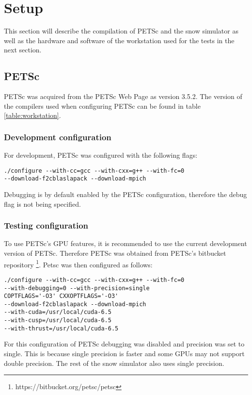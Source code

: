 \section{Setup}

This section will describe the compilation of PETSc and the snow simulator as well 
as the hardware and software of the workstation used for the tests in the next section. 

\subsection{PETSc}

PETSc was acquired from the PETSc Web Page\cite{petsc-web-page} as version 3.5.2. 
The version of the compilers used when configuring PETSc can be found in table 
\ref{table:workstation}.

\subsubsection{Development configuration}

For development, PETSc was configured with the following flags:
\lstset{language=bash}
\begin{lstlisting}
./configure --with-cc=gcc --with-cxx=g++ --with-fc=0 
--download-f2cblaslapack --download-mpich
\end{lstlisting}
Debugging is by default enabled by the PETSc configuration, therefore the debug 
flag is not being specified.

\subsubsection{Testing configuration}

To use PETSc's GPU features, it is recommended to use the current development 
version of PETSc. Therefore PETSc was obtained from PETSc's bitbucket repository
\footnote{https://bitbucket.org/petsc/petsc}. Petsc was then configured as follows:
\lstset{language=bash}
\begin{lstlisting}
./configure --with-cc=gcc --with-cxx=g++ --with-fc=0
--with-debugging=0 --with-precision=single
COPTFLAGS='-O3' CXXOPTFLAGS='-O3' 
--download-f2cblaslapack --download-mpich
--with-cuda=/usr/local/cuda-6.5 
--with-cusp=/usr/local/cuda-6.5 
--with-thrust=/usr/local/cuda-6.5
\end{lstlisting}
For this configuration of PETSc debugging was disabled and precision was set to 
single. This is because single precision is faster and some GPUs may not support 
double precision. The rest of the snow simulator also uses single precision.

